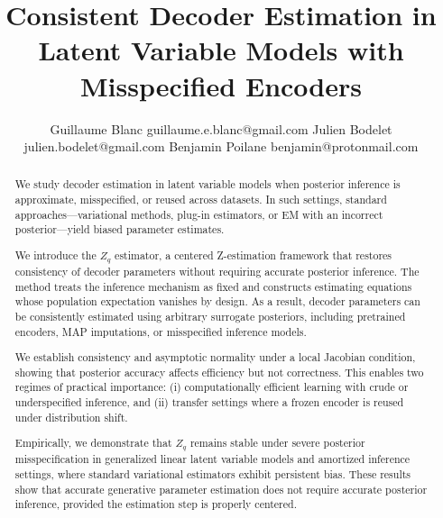 \documentclass[twoside,11pt]{article}
\begin{document}
\title{Consistent Decoder Estimation in Latent Variable Models with Misspecified Encoders}

\author{\name Guillaume Blanc \email guillaume.e.blanc@gmail.com
  \AND
  \name Julien Bodelet \email julien.bodelet@gmail.com
  \AND
  \name Benjamin Poilane \email benjamin@protonmail.com
}

\editor{} %

\maketitle

\begin{abstract}

We study decoder estimation in latent variable models when posterior inference is approximate, misspecified, or reused across datasets. In such settings, standard approaches—variational methods, plug-in estimators, or EM with an incorrect posterior—yield biased parameter estimates.

We introduce the $Z_q$ estimator, a centered Z-estimation framework that restores consistency of decoder parameters without requiring accurate posterior inference. The method treats the inference mechanism as fixed and constructs estimating equations whose population expectation vanishes by design. As a result, decoder parameters can be consistently estimated using arbitrary surrogate posteriors, including pretrained encoders, MAP imputations, or misspecified inference models.

We establish consistency and asymptotic normality under a local Jacobian condition, showing that posterior accuracy affects efficiency but not correctness. This enables two regimes of practical importance: (i) computationally efficient learning with crude or underspecified inference, and (ii) transfer settings where a frozen encoder is reused under distribution shift.

Empirically, we demonstrate that $Z_q$ remains stable under severe posterior misspecification in generalized linear latent variable models and amortized inference settings, where standard variational estimators exhibit persistent bias. These results show that accurate generative parameter estimation does not require accurate posterior inference, provided the estimation step is properly centered.

\end{abstract}



\newpage
\end{document}
